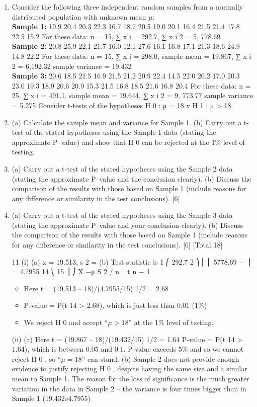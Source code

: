 \documentclass[a4paper,12pt]{article}
\begin{document}
\begin{enumerate}
\item %
Consider the following three independent random samples from a normally
distributed population with unknown mean $\mu$:
\\
\noindent \textbf{Sample 1:}
19.9 20.4 20.3 22.3 16.7 18.7 20.5 19.0 20.1 16.4 21.5 21.4 17.8 22.5 15.2
For these data: n = 15,
∑ x i = 292.7,
∑ x i 2 = 5, 778.69
\\
\noindent \textbf{Sample 2:}
20.8 25.9 22.1 21.7 16.0 12.1 27.6 16.1 16.8 17.1 21.3 18.6 24.9 14.8 22.2
For these data: n = 15,
∑ x i = 298.0,
sample mean = 19.867,
∑ x i 2 = 6,192.32
sample variance = 19.432
\\
\noindent \textbf{Sample 3:}
20.6 18.5 21.5 16.9 21.5 21.2 20.9 22.4 14.5 22.0 20.2 17.0 20.3 23.0 19.3
18.9 20.6 20.9 15.3 21.5 16.8 18.5 21.6 16.8 20.4
For these data: n = 25, ∑ x i = 491.1,
sample mean = 19.644,
∑ x i 2 = 9, 773.77
sample variance = 5.275
Consider t-tests of the hypotheses H 0 : μ = 18 v H 1 : μ > 18.
\item 

(a) Calculate the sample mean and variance for Sample 1.
(b) Carry out a t-test of the stated hypotheses using the Sample 1 data (stating the approximate P–value) and show that H 0 can be rejected at the 1\% level of testing.
\item 
(a) Carry out a t-test of the stated hypotheses using the Sample 2 data (stating the approximate P–value and the conclusion clearly).
(b) Discuss the comparison of the results with those based on Sample 1 (include reasons for any difference or similarity in the test
conclusions).
[6]
\item 
(a) Carry out a t-test of the stated hypotheses using the Sample 3 data (stating the approximate P–value and your conclusion clearly).
(b) Discuss the comparison of the results with those based on Sample 1 (include reasons for any difference or similarity in the test
conclusions).
[6]
[Total 18]
\newpage

11
(i)
(a) x = 19.513, s 2 =
(b) Test statistic is
1 ⎛
292.7 2 ⎞
⎜ ⎜ 5778.69 −
⎟ = 4.7955
14 ⎝
15 ⎟ ⎠
X −μ
S 2 / n
~ t n − 1
\begin{itemize}
\item Here t = (19.513 – 18)/(4.7955/15) 1/2 = 2.68
\item P-value = P(t 14 > 2.68), which is just less than 0.01 (1\%)
\item We reject H 0 and accept “$\mu > 18$” at the 1\% level of testing.
\end{itemize}
(ii)
(a)
Here t = (19.867 – 18)/(19.432/15) 1/2 = 1.64
P-value = P(t 14 > 1.64), which is between 0.05 and 0.1.
P-value exceeds 5\% and so we cannot reject H 0 , so “$\mu = 18$” can stand.
(b)
Sample 2 does not provide enough evidence to justify rejecting H 0 , despite having the same size and a similar mean to Sample 1.
The reason for the loss of significance is the much greater variation in the data in Sample 2 – the variance is four times bigger than in Sample 1 ($19.432 v 4.7955$)


\end{enumerate}
\end{document}
